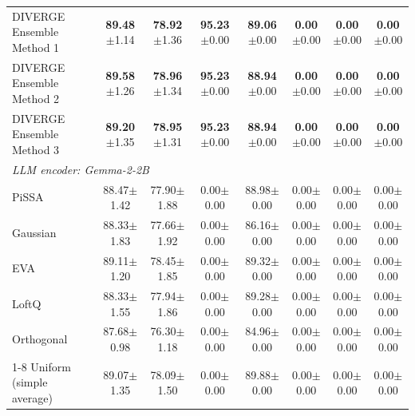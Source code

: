 \documentclass[a4paper,fleqn]{cas-sc}
\begin{document}
\begin{table}[htbp]
\begin{tabular*}{\textwidth}{@{\extracolsep{\fill}} lccccccc @{}}
DIVERGE Ensemble Method 1 & \textbf{89.48}{\scriptsize$\pm$1.14} & \textbf{78.92}{\scriptsize$\pm$1.36} & \textbf{95.23}{\scriptsize$\pm$0.00} & \textbf{89.06}{\scriptsize$\pm$0.00} & \textbf{0.00}{\scriptsize$\pm$0.00} & \textbf{0.00}{\scriptsize$\pm$0.00} & \textbf{0.00}{\scriptsize$\pm$0.00} \\
DIVERGE Ensemble Method 2 & \textbf{89.58}{\scriptsize$\pm$1.26} & \textbf{78.96}{\scriptsize$\pm$1.34} & \textbf{95.23}{\scriptsize$\pm$0.00} & \textbf{88.94}{\scriptsize$\pm$0.00} & \textbf{0.00}{\scriptsize$\pm$0.00} & \textbf{0.00}{\scriptsize$\pm$0.00} & \textbf{0.00}{\scriptsize$\pm$0.00} \\
DIVERGE Ensemble Method 3 & \textbf{89.20}{\scriptsize$\pm$1.35} & \textbf{78.95}{\scriptsize$\pm$1.31} & \textbf{95.23}{\scriptsize$\pm$0.00} & \textbf{88.94}{\scriptsize$\pm$0.00} & \textbf{0.00}{\scriptsize$\pm$0.00} & \textbf{0.00}{\scriptsize$\pm$0.00} & \textbf{0.00}{\scriptsize$\pm$0.00} \\
\midrule
\multicolumn{8}{l}{\textit{LLM encoder: Gemma-2-2B}} \\
\midrule
PiSSA                     & 88.47{\scriptsize$\pm$1.42} & 77.90{\scriptsize$\pm$1.88} & 0.00{\scriptsize$\pm$0.00} & 88.98{\scriptsize$\pm$0.00} & 0.00{\scriptsize$\pm$0.00} & 0.00{\scriptsize$\pm$0.00} & 0.00{\scriptsize$\pm$0.00} \\
Gaussian                  & 88.33{\scriptsize$\pm$1.83} & 77.66{\scriptsize$\pm$1.92} & 0.00{\scriptsize$\pm$0.00} & 86.16{\scriptsize$\pm$0.00} & 0.00{\scriptsize$\pm$0.00} & 0.00{\scriptsize$\pm$0.00} & 0.00{\scriptsize$\pm$0.00} \\
EVA                       & 89.11{\scriptsize$\pm$1.20} & 78.45{\scriptsize$\pm$1.85} & 0.00{\scriptsize$\pm$0.00} & 89.32{\scriptsize$\pm$0.00} & 0.00{\scriptsize$\pm$0.00} & 0.00{\scriptsize$\pm$0.00} & 0.00{\scriptsize$\pm$0.00} \\
LoftQ                     & 88.33{\scriptsize$\pm$1.55} & 77.94{\scriptsize$\pm$1.86} & 0.00{\scriptsize$\pm$0.00} & 89.28{\scriptsize$\pm$0.00} & 0.00{\scriptsize$\pm$0.00} & 0.00{\scriptsize$\pm$0.00} & 0.00{\scriptsize$\pm$0.00} \\
Orthogonal                & 87.68{\scriptsize$\pm$0.98} & 76.30{\scriptsize$\pm$1.18} & 0.00{\scriptsize$\pm$0.00} & 84.96{\scriptsize$\pm$0.00} & 0.00{\scriptsize$\pm$0.00} & 0.00{\scriptsize$\pm$0.00} & 0.00{\scriptsize$\pm$0.00} \\
\cmidrule(lr){1-8}
Uniform (simple average)  & 89.07{\scriptsize$\pm$1.35} & 78.09{\scriptsize$\pm$1.50} & 0.00{\scriptsize$\pm$0.00} & 89.88{\scriptsize$\pm$0.00} & 0.00{\scriptsize$\pm$0.00} & 0.00{\scriptsize$\pm$0.00} & 0.00{\scriptsize$\pm$0.00} \\

\end{tabular*}
\end{table}
\end{document}
